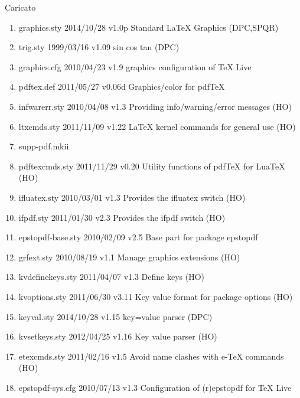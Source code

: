 Caricato 
\begin{enumerate}
\item graphics.sty 2014/10/28 v1.0p Standard LaTeX Graphics (DPC,SPQR)
\item trig.sty 1999/03/16 v1.09 sin cos tan (DPC)
\item graphics.cfg 2010/04/23 v1.9 graphics configuration of TeX Live
\item pdftex.def 2011/05/27 v0.06d Graphics/color for pdfTeX
\item infwarerr.sty 2010/04/08 v1.3 Providing info/warning/error messages (HO)
\item ltxcmds.sty 2011/11/09 v1.22 LaTeX kernel commands for general use (HO)
\item supp-pdf.mkii
\item pdftexcmds.sty 2011/11/29 v0.20 Utility functions of pdfTeX for LuaTeX (HO)
\item ifluatex.sty 2010/03/01 v1.3 Provides the ifluatex switch (HO)
\item ifpdf.sty 2011/01/30 v2.3 Provides the ifpdf switch (HO)
\item epstopdf-base.sty 2010/02/09 v2.5 Base part for package epstopdf
\item grfext.sty 2010/08/19 v1.1 Manage graphics extensions (HO)
\item kvdefinekeys.sty 2011/04/07 v1.3 Define keys (HO)
\item kvoptions.sty 2011/06/30 v3.11 Key value format for package options (HO)
\item keyval.sty 2014/10/28 v1.15 key=value parser (DPC)
\item kvsetkeys.sty 2012/04/25 v1.16 Key value parser (HO)
\item etexcmds.sty 2011/02/16 v1.5 Avoid name clashes with e-TeX commands (HO)
\item epstopdf-sys.cfg 2010/07/13 v1.3 Configuration of (r)epstopdf for TeX Live
\end{enumerate}	
